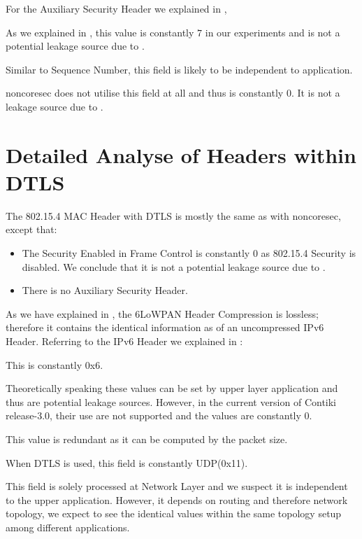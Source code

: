 For the Auxiliary Security Header we explained in ,

\begin{description}[style=nextline]
	\item[Security Level]
	As we explained in , this value is constantly $7$ in our experiments and is not a potential leakage source due to .
	\item[Frame Counter]
	Similar to Sequence Number, this field is likely to be independent to application.
	\item[Key Strategy]
	noncoresec does not utilise this field at all and thus is constantly $0$. It is not a leakage source due to .
\end{description}

\section{Detailed Analyse of Headers within DTLS} \label{Detail DTLS Header}

The 802.15.4  MAC Header with DTLS is mostly the same as with noncoresec, except that:

\begin{itemize}
	\item The Security Enabled in Frame Control is constantly $0$ as 802.15.4 Security is disabled. We conclude that it is not a potential leakage source due to .
	\item There is no Auxiliary Security Header.
\end{itemize}

As we have explained in , the 6LoWPAN Header Compression is lossless; therefore it contains the identical information as of an uncompressed IPv6 Header. Referring to the IPv6 Header we explained in :

\begin{description}[style=nextline]
	\item[Version]
	This is constantly 0x6.
	\item[Traffic Class and Flow Label]
	Theoretically speaking these values can be set by upper layer application and thus are potential leakage sources. However, in the current version of Contiki release-3.0, their use are not supported and the values are constantly $0$.
	\item[Payload Length]
	This value is redundant as it can be computed by the packet size.
	\item[Next Header]
	When DTLS is used, this field is constantly UDP(0x11).
	\item[Hop Limit]
	This field is solely processed at Network Layer and we suspect it is independent to the upper application. However, it depends on routing and therefore network topology, we expect to see the identical values within the same topology setup among different applications.
\end{description}

